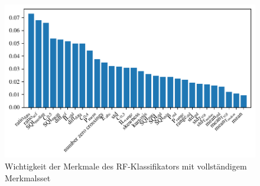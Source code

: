 \begin{figure}[H]
	\centering
	\includegraphics{pic/rf-clf-all-importances.pdf}
 	\caption{Wichtigkeit der Merkmale des \ac{RF}-Klassifikators mit vollständigem Merkmalsset}
 	\label{fig:rf-clf-all-importances}
\end{figure}

